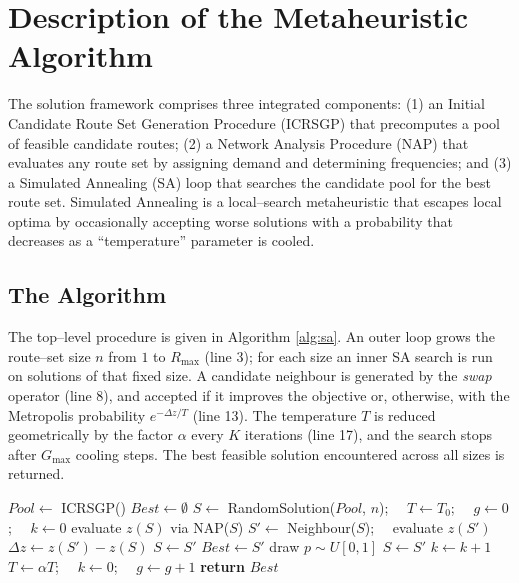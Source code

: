 \documentclass [a4paper, 11pt, titlepage] {article}
\begin{document}
\section{Description of the Metaheuristic Algorithm}
\label{algorithm}

The solution framework comprises three integrated components: (1) an Initial
Candidate Route Set Generation Procedure (ICRSGP) that precomputes a pool of
feasible candidate routes; (2) a Network Analysis Procedure (NAP) that evaluates
any route set by assigning demand and determining frequencies; and (3) a
Simulated Annealing (SA) loop that searches the candidate pool for the best
route set. Simulated Annealing \cite{eglese1990} is a local--search
metaheuristic that escapes local optima by occasionally accepting worse
solutions with a probability that decreases as a ``temperature'' parameter is
cooled.

\subsection{The Algorithm}
The top--level procedure is given in Algorithm \ref{alg:sa}. An outer loop grows
the route--set size $n$ from $1$ to $R_{\max}$ (line 3); for each size an inner
SA search is run on solutions of that fixed size. A candidate neighbour is
generated by the \emph{swap} operator (line 8), and accepted if it improves the
objective or, otherwise, with the Metropolis probability $e^{-\Delta z/T}$
(line 13). The temperature $T$ is reduced geometrically by the factor $\alpha$
every $K$ iterations (line 17), and the search stops after $G_{\max}$ cooling
steps. The best feasible solution encountered across all sizes is returned.

\begin{algorithm}
  \caption{SA Framework for the BTRNDP} \label{alg:sa}
  \begin{algorithmic}[1]
    \STATE $Pool \leftarrow$ ICRSGP()
    \STATE $Best \leftarrow \emptyset$
      \STATE $S \leftarrow$ RandomSolution($Pool$, $n$);~~ $T \leftarrow T_0$;~~ $g \leftarrow 0$;~~ $k \leftarrow 0$
        \STATE evaluate $z(S)$ via NAP($S$)
        \STATE $S' \leftarrow$ Neighbour($S$);~~ evaluate $z(S')$
        \STATE $\Delta z \leftarrow z(S') - z(S)$
          \STATE $S \leftarrow S'$
           \STATE $Best \leftarrow S'$ \ENDIF
        \ELSE
          \STATE draw $p \sim U[0,1]$
           \STATE $S \leftarrow S'$ \ENDIF
        \ENDIF
        \STATE $k \leftarrow k + 1$
         \STATE $T \leftarrow \alpha T$;~~ $k \leftarrow 0$;~~ $g \leftarrow g + 1$ \ENDIF
      \ENDWHILE
    \ENDFOR
    \STATE \textbf{return} $Best$
  \end{algorithmic}
\end{algorithm}
\end{document}
